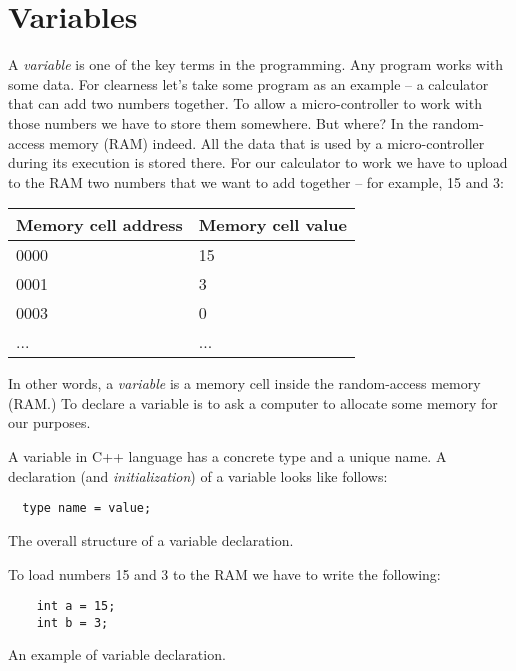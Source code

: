 \documentclass[../sparc.tex]{subfiles}
\begin{document}
\section{Variables}

A \emph{variable} is one of the key terms in the programming.  Any program works
with some data.  For clearness let's take some program as an example -- a
calculator that can add two numbers together.  To allow a micro-controller to
work with those numbers we have to store them somewhere.  But where?  In the
random-access memory (RAM) indeed.  All the data that is used by a
micro-controller during its execution is stored there.  For our calculator to
work we have to upload to the RAM two numbers that we want to add together -- for
example, 15 and 3:

\begin{tabular}{p{4cm}|p{6cm}}
  Memory cell address & Memory cell value \\
  \hline \hline
  0000 & 15 \\
  \hline
  0001 & 3 \\
  \hline
  0003 & 0 \\
  ... & ... \\
\end{tabular}

In other words, a \emph{variable} is a memory cell inside the random-access
memory (RAM.)  To declare a variable is to ask a computer to allocate some
memory for our purposes.

A variable in C++ language has a concrete type and a unique name.  A declaration
(and \emph{initialization}) of a variable looks like follows:

\begin{listing}[ht]
\begin{verbatim}
  type name = value;
\end{verbatim}
\label{listing:dialogues-with-computer-variable-definition-structure}
\caption{The overall structure of a variable declaration.}
\end{listing}

To load numbers 15 and 3 to the RAM we have to write the following:

\begin{listing}[ht]
  \begin{verbatim}
    int a = 15;
    int b = 3;
  \end{verbatim}
  \label{listing:dialogues-with-computer-variable-definition-example}
  \caption{An example of variable declaration.}
\end{listing}
\end{document}
